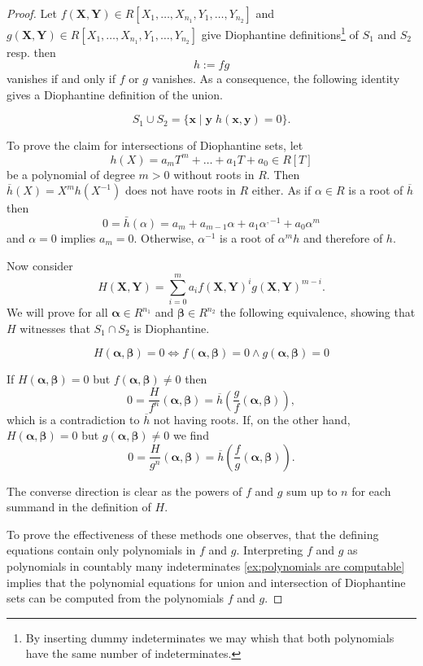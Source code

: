 \begin{proof}
Let $f(\mathbf{X}, \mathbf{Y}) ∈ R[X_1, …, X_{n_1}, Y_1, …, Y_{n_2}]$ and
$g(\mathbf{X}, \mathbf{Y}) ∈ R[X_1, …, X_{n_1}, Y_1, …, Y_{n_2}]$ give
Diophantine definitions\footnote{By inserting dummy indeterminates we may whish
that both polynomials have the same number of indeterminates.} of $S_1$ and
$S_2$ resp. then
\[
  h := f g
\]
vanishes if and only if $f$ or $g$ vanishes. As a consequence, the
following identity gives a Diophantine definition of the union.

\[ S_1 ∪ S_2 = \lbrace \mathbf{x} \mid \mathbf{y} \; h(\mathbf{x}, \mathbf{y}) = 0 \rbrace. \]

To prove the claim for intersections of Diophantine sets, let
\[
  h(X) = a_m T^m + … + a_1 T + a_0 ∈ R[T]
\]
be a polynomial of degree $m > 0$ without roots in $R$. Then
$\overline h(X) = X^m h(X^{-1})$ does not have roots in $R$ either. As if
$α ∈ R$ is a root of $\overline h$ then
\[
  0 = \bar h(α) = a_m + a_{m-1} α + a_1 α^{,-1} + a_0 α^m
\]
and $α = 0$ implies $a_m = 0$. Otherwise, $α^{-1}$ is a root of
$α^m h$ and therefore of $h$.

Now consider
\[
  H(\mathbf{X}, \mathbf{Y}) = \sum_{i=0}^m a_i f(\mathbf{X}, \mathbf{Y})^i g(\mathbf{X}, \mathbf{Y})^{m - i}.
\]
We will prove for all $\mathbf{α} ∈ R^{n_1}$ and $\mathbf{β} ∈ R^{n_2}$ the
following equivalence, showing that $H$ witnesses that $S_1 ∩ S_2$ is
Diophantine.

\[ H(\mathbf α, \mathbf β) = 0 \Leftrightarrow f(\mathbf α, \mathbf β) = 0 ∧ g(\mathbf α, \mathbf β) = 0 \]

If $H(\mathbf α, \mathbf β) = 0$ but $f(\mathbf α, \mathbf β) ≠ 0$ then
\[
  0 = \frac H {f^n} (\mathbf α, \mathbf β) = \overline h \left(\frac gf (\mathbf α, \mathbf β) \right),
\]
which is a contradiction to $\overline h$ not having roots. If, on the
other hand, $H(\mathbf α, \mathbf β) = 0$ but $g(\mathbf α, \mathbf β) ≠ 0$
we find
\[
  0 = \frac H {g^n}(\mathbf α, \mathbf β) = \overline h \left( \frac fg (\mathbf α, \mathbf β) \right).
\]

The converse direction is clear as the powers of $f$ and $g$ sum up
to $n$ for each summand in the definition of $H$.

To prove the effectiveness of these methods one observes, that the defining
equations contain only polynomials in $f$ and $g$. Interpreting $f$ and $g$ as
polynomials in countably many indeterminates \cref{ex:polynomials are
computable} implies that the polynomial equations for union and intersection of
Diophantine sets can be computed from the polynomials $f$ and $g$.
\end{proof}


